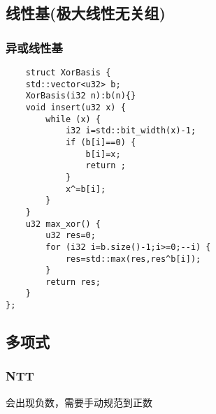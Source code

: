 \documentclass[UTF8]{ctexart}
\begin{document}
\subsection{线性基(极大线性无关组)}
\subsubsection{异或线性基}
\begin{lstlisting}
    struct XorBasis {
    std::vector<u32> b;
    XorBasis(i32 n):b(n){}
    void insert(u32 x) {
        while (x) {
            i32 i=std::bit_width(x)-1;
            if (b[i]==0) {
                b[i]=x;
                return ;
            }
            x^=b[i];
        }
    }
    u32 max_xor() {
        u32 res=0;
        for (i32 i=b.size()-1;i>=0;--i) {
            res=std::max(res,res^b[i]);
        }
        return res;
    }
};
\end{lstlisting}
\subsection{多项式}
\subsubsection{NTT}
会出现负数，需要手动规范到正数
\end{document}
